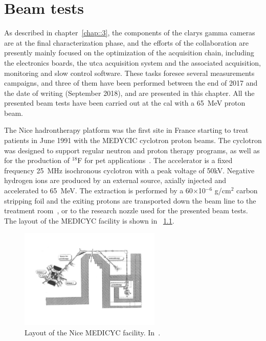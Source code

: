 \chapter{Beam tests}\label{chap::6}

\vfill

\minitoc

\newpage

\glsresetall
{} 


As described in chapter~\ref{chap::3}, the components of the \gls{clarys} gamma cameras are at the final characterization phase, and the efforts of the collaboration are presently mainly focused on the optimization of the acquisition chain, including the electronics boards, the \gls{utca} acquisition system and the associated acquisition, monitoring and slow control software. These tasks foresee several measurements campaigns, and three of them have been performed between the end of 2017 and the date of writing (September 2018), and are presented in this chapter. 
All the presented beam tests have been carried out at the \gls{cal} with a 65~MeV proton beam. 

The Nice hadrontherapy platform was the first site in France starting to treat patients in June 1991 with the MEDYCIC cyclotron proton beams. The cyclotron was designed to support regular neutron and proton therapy programs, as well as for the production of $^{18}$F for \gls{pet} applications~\parencite{Mandrillon1989, Mandrillon1992}. The accelerator is a fixed frequency 25~MHz isochronous cyclotron with a peak voltage of 50kV. Negative hydrogen ions are produced by an external source, axially injected and accelerated to 65~MeV. The extraction is performed by a 60$\times$10$^{-6}$ g/cm$^2$ carbon stripping foil and the exiting protons are transported down the beam line to the treatment room~\parencite{Herault2005}, or to the research nozzle used for the presented beam tests. The layout of the MEDICYC facility is shown in \figurename~\ref{chap6::fig::MEDICYC_layout}.

 \begin{figure}[!htbp]
\centering
\includegraphics[width=0.6\textwidth]{03_GraphicFiles/chapter6_BeamTests/MEDiCYC.pdf}
\caption{Layout of the Nice MEDICYC facility. In~\cite{Mandrillon1992}.}
\label{chap6::fig::MEDICYC_layout}
\end{figure}

